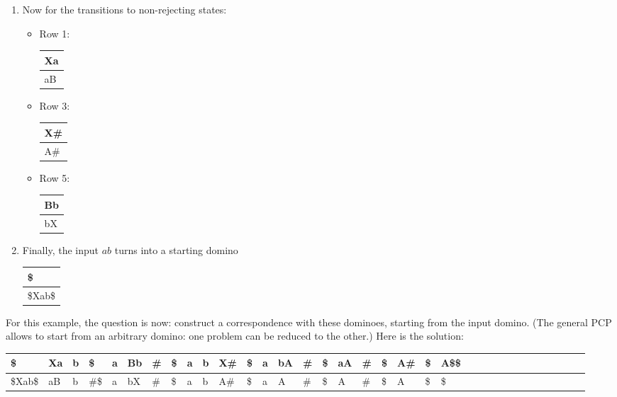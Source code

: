 \begin{example}
\begin{enumerate}
\item Now for the transitions to non-rejecting states:
\begin{itemize}
\item Row 1:
\begin{tabular}{|l|}
\hline
Xa \\ \hline
aB \\
\hline
\end{tabular}

\item Row 3:
\begin{tabular}{|l|}
\hline
X\# \\ \hline
A\# \\
\hline
\end{tabular}

\item Row 5:
\begin{tabular}{|l|}
\hline
Bb \\ \hline
bX \\
\hline
\end{tabular}

\end{itemize}

\item Finally, the input $ab$ turns into a starting domino
\begin{tabular}{|l|}
\hline
\$ \\ \hline
\$Xab\$ \\
\hline
\end{tabular}
\end{enumerate}
\end{example}

For this example, the question is now: construct a correspondence with these dominoes,
starting from the input domino. (The general PCP allows to
  start from an arbitrary domino: one problem can be reduced to the
  other.) Here is the solution:


{\footnotesize
\begin{tabular}{|l|l|l|l|l|l|l|l|l|l|l|l|l|l|l|l|l|l|l|l|l|l|l|l|l|l|l|l|l|l|l|l|l|l|}
\hline
\$      & Xa & b & \$   & a & Bb & \# & \$ & a & b & X\# & \$ &  a & bA & \# & \$ & aA & \# & \$ & A\# & \$ & A\$\$\\ \hline
\$Xab\$ & aB & b & \#\$ & a & bX & \# & \$ & a & b & A\# & \$ &  a &  A & \# & \$ & A  & \# & \$ & A   & \$ & \$  \\
\hline
\end{tabular}
}


